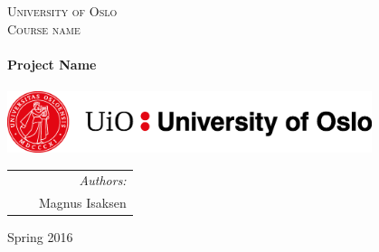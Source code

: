 \thispagestyle{empty}

\begin{center}



\textsc{\LARGE University of Oslo}\\[0.5cm]

\textsc{\Large Course name}\\[2cm]
 

\HRule \\[0.4cm]
 \LARGE \textbf{Project Name}  \\[0.2cm]
\HRule \\[2.5cm]

\vspace{2cm}
\includegraphics[width=0.8\textwidth]{Figures/UiO_Seal_A_ENG.png}\\  %

\vfill 
 
\begin{tabularx}{\textwidth}{l X r}
\hline
& & \large \emph{Authors:}\\
& & \large Magnus Isaksen \\
\hline

\end{tabularx}




\vfill

{\large Spring 2016}

\end{center}
\cleardoublepage

